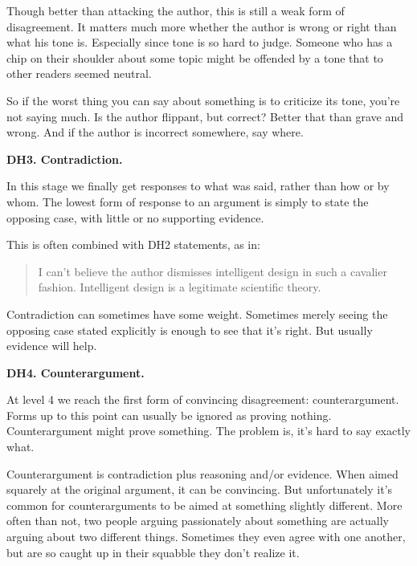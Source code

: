                   Though better than attacking the author, this is still a weak
                  form of disagreement. It matters much more whether the author
                  is wrong or right than what his tone is. Especially since tone
                  is so hard to judge. Someone who has a chip on their shoulder
                  about some topic might be offended by a tone that to other
                  readers seemed neutral.

So if the worst thing you
                  can say about something is to criticize its tone, you're not
                  saying much. Is the author flippant, but correct? Better that
                  than grave and wrong. And if the author is incorrect
                  somewhere, say where.

\textbf{DH3. Contradiction.}

In this stage we finally get responses to what
                  was said, rather than how or by whom. The lowest form of
                  response to an argument is simply to state the opposing case,
                  with little or no supporting evidence.

This is
                  often combined with DH2 statements, as in:
                  \begin{quote}

                    I can't believe the author dismisses intelligent design in
                    such a cavalier fashion. Intelligent design is a legitimate
                    scientific theory.
                  
\end{quote}

                  Contradiction can sometimes have some weight. Sometimes merely
                  seeing the opposing case stated explicitly is enough to see
                  that it's right. But usually evidence will help.

\textbf{DH4. Counterargument.}

At level 4 we reach the first form of convincing
                  disagreement: counterargument. Forms up to this point can
                  usually be ignored as proving nothing. Counterargument might
                  prove something. The problem is, it's hard to say exactly
                  what.

Counterargument is contradiction plus
                  reasoning and/or evidence. When aimed squarely at the original
                  argument, it can be convincing. But unfortunately it's common
                  for counterarguments to be aimed at something slightly
                  different. More often than not, two people arguing
                  passionately about something are actually arguing about two
                  different things. Sometimes they even agree with one another,
                  but are so caught up in their squabble they don't realize
                  it.

